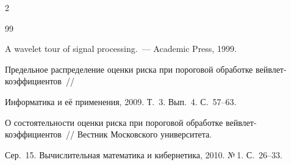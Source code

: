 \begin{multicols}{2}
{{\begin{thebibliography}{99}




A wavelet tour of signal processing.~--- Academic Press, 1999.












Предельное распределение оценки риска при пороговой обработке вейвлет-ко\-эф\-фи\-ци\-ен\-тов~// 


Информатика и её применения, 2009. Т.~3. Вып.~4. С.~57--63.





\label{end\stat}









О состоятельности оценки риска при пороговой обработке вейвлет-ко\-эф\-фи\-ци\-ен\-тов~// Вестник Московского университета. 


Сер.~15. Вычислительная математика и кибернетика, 2010. №\,1. С.~26--33.








 \end{thebibliography}


}


}





\end{multicols}


